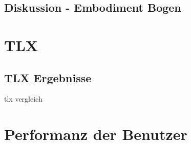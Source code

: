 \subsection{Diskussion - Embodiment Bogen}


\section{TLX}


\subsection{TLX Ergebnisse}
\cite{Abtahi2019}
tlx vergleich

\section{Performanz der Benutzer}


















